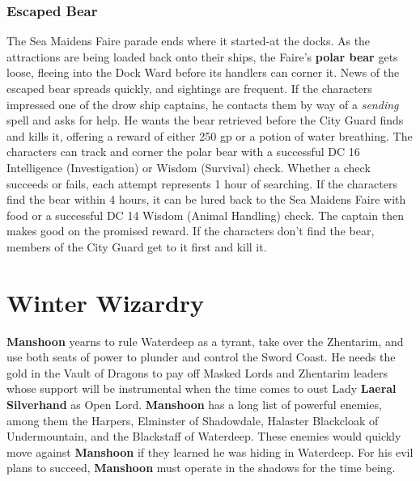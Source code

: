 \documentclass[10pt,a4paper,twoside,twocolumn,openany,nodeprecatedcode]{dndbook}
\begin{document}
\subsection{Escaped Bear}
The Sea Maidens Faire parade ends where it started-at the docks. As the attractions are being loaded back onto their ships, the Faire's \textbf{polar bear} gets loose, fleeing into the Dock Ward before its handlers can corner it. News of the escaped bear spreads quickly, and sightings are frequent. If the characters impressed one of the drow ship captains, he contacts them by way of a \textit{sending} spell and asks for help. He wants the bear retrieved before the City Guard finds and kills it, offering a reward of either 250 gp or a potion of water breathing.
The characters can track and corner the polar bear with a successful DC 16 Intelligence (Investigation) or Wisdom (Survival) check. Whether a check succeeds or fails, each attempt represents 1 hour of searching. If the characters find the bear within 4 hours, it can be lured back to the Sea Maidens Faire with food or a successful DC 14 Wisdom (Animal Handling) check. The captain then makes good on the promised reward. If the characters don't find the bear, members of the City Guard get to it first and kill it.
\chapter{Winter Wizardry}
\textbf{Manshoon} yearns to rule Waterdeep as a tyrant, take over the Zhentarim, and use both seats of power to plunder and control the Sword Coast. He needs the gold in the Vault of Dragons to pay off Masked Lords and Zhentarim leaders whose support will be instrumental when the time comes to oust Lady \textbf{Laeral Silverhand} as Open Lord. \textbf{Manshoon} has a long list of powerful enemies, among them the Harpers, Elminster of Shadowdale, Halaster Blackcloak of Undermountain, and the Blackstaff of Waterdeep. These enemies would quickly move against \textbf{Manshoon} if they learned he was hiding in Waterdeep. For his evil plans to succeed, \textbf{Manshoon} must operate in the shadows for the time being.
\end{document}
